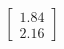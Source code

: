 \documentclass[preview]{standalone}
\begin{document}
\begin{align*}
\begin{bmatrix} 1.84 \\ 2.16 \end{bmatrix}
\end{align*}
\end{document}
